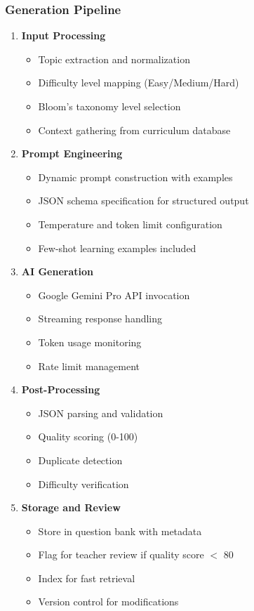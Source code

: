 \documentclass[conference]{IEEEtran}
\begin{document}
\subsubsection{Generation Pipeline}
\begin{enumerate}
    \item \textbf{Input Processing}
    \begin{itemize}
        \item Topic extraction and normalization
        \item Difficulty level mapping (Easy/Medium/Hard)
        \item Bloom's taxonomy level selection
        \item Context gathering from curriculum database
    \end{itemize}
    
    \item \textbf{Prompt Engineering}
    \begin{itemize}
        \item Dynamic prompt construction with examples
        \item JSON schema specification for structured output
        \item Temperature and token limit configuration
        \item Few-shot learning examples included
    \end{itemize}
    
    \item \textbf{AI Generation}
    \begin{itemize}
        \item Google Gemini Pro API invocation
        \item Streaming response handling
        \item Token usage monitoring
        \item Rate limit management
    \end{itemize}
    
    \item \textbf{Post-Processing}
    \begin{itemize}
        \item JSON parsing and validation
        \item Quality scoring (0-100)
        \item Duplicate detection
        \item Difficulty verification
    \end{itemize}
    
    \item \textbf{Storage and Review}
    \begin{itemize}
        \item Store in question bank with metadata
        \item Flag for teacher review if quality score $<$ 80
        \item Index for fast retrieval
        \item Version control for modifications
    \end{itemize}
\end{enumerate}
\end{document}

